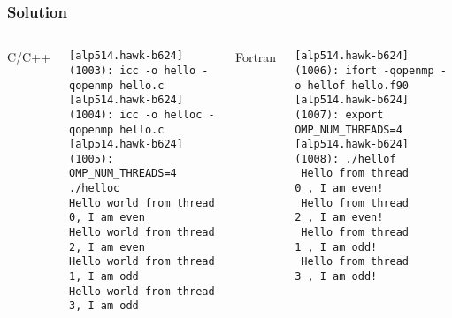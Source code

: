 \documentclass[10pt,t]{beamer}
\begin{document}
\begin{frame}[fragile]
  \frametitle{Solution}
  \begin{columns}
    \begin{exampleblock}{C/C++}
      
    \end{exampleblock}
    \begin{block}{}
      {\fontsize{4}{5}\selectfont
        \begin{Verbatim}
[alp514.hawk-b624](1003): icc -o hello -qopenmp hello.c
[alp514.hawk-b624](1004): icc -o helloc -qopenmp hello.c
[alp514.hawk-b624](1005): OMP_NUM_THREADS=4 ./helloc
Hello world from thread 0, I am even
Hello world from thread 2, I am even
Hello world from thread 1, I am odd
Hello world from thread 3, I am odd
        \end{Verbatim}
      }
    \end{block}
    \begin{exampleblock}{Fortran}
      
    \end{exampleblock}
    \begin{block}{}
      {\fontsize{4}{5}\selectfont
        \begin{Verbatim}
[alp514.hawk-b624](1006): ifort -qopenmp -o hellof hello.f90
[alp514.hawk-b624](1007): export OMP_NUM_THREADS=4
[alp514.hawk-b624](1008): ./hellof
 Hello from thread           0 , I am even!
 Hello from thread           2 , I am even!
 Hello from thread           1 , I am odd!
 Hello from thread           3 , I am odd!
        \end{Verbatim}
      }
    \end{block}
  \end{columns}
\end{frame}
\end{document}
